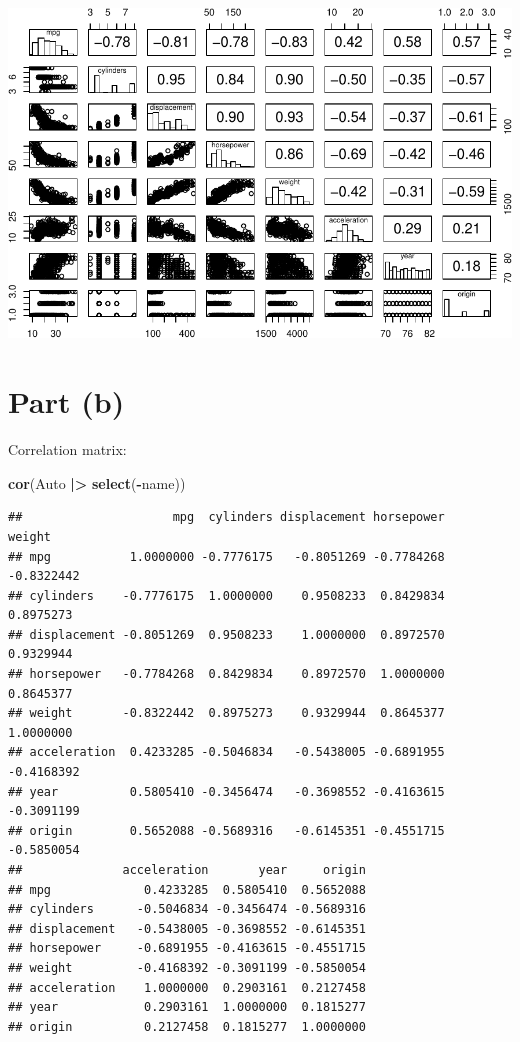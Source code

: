 \documentclass[
  11pt,
  a4paper]{article}
\newenvironment{Shaded}{\begin{snugshade}}{\end{snugshade}}
\newcommand{\FunctionTok}[1]{\textcolor[rgb]{0.13,0.29,0.53}{\textbf{#1}}}
\newcommand{\NormalTok}[1]{#1}
\newcommand{\SpecialCharTok}[1]{\textcolor[rgb]{0.81,0.36,0.00}{\textbf{#1}}}
\begin{document}
\includegraphics{Exercise-3.9_files/figure-latex/unnamed-chunk-3-1.pdf}

\section{Part (b)}\label{part-b}

Correlation matrix:

\begin{Shaded}
\begin{Highlighting}[]
\FunctionTok{cor}\NormalTok{(Auto }\SpecialCharTok{|\textgreater{}} \FunctionTok{select}\NormalTok{(}\SpecialCharTok{{-}}\NormalTok{name))}
\end{Highlighting}
\end{Shaded}

\begin{verbatim}
##                     mpg  cylinders displacement horsepower     weight
## mpg           1.0000000 -0.7776175   -0.8051269 -0.7784268 -0.8322442
## cylinders    -0.7776175  1.0000000    0.9508233  0.8429834  0.8975273
## displacement -0.8051269  0.9508233    1.0000000  0.8972570  0.9329944
## horsepower   -0.7784268  0.8429834    0.8972570  1.0000000  0.8645377
## weight       -0.8322442  0.8975273    0.9329944  0.8645377  1.0000000
## acceleration  0.4233285 -0.5046834   -0.5438005 -0.6891955 -0.4168392
## year          0.5805410 -0.3456474   -0.3698552 -0.4163615 -0.3091199
## origin        0.5652088 -0.5689316   -0.6145351 -0.4551715 -0.5850054
##              acceleration       year     origin
## mpg             0.4233285  0.5805410  0.5652088
## cylinders      -0.5046834 -0.3456474 -0.5689316
## displacement   -0.5438005 -0.3698552 -0.6145351
## horsepower     -0.6891955 -0.4163615 -0.4551715
## weight         -0.4168392 -0.3091199 -0.5850054
## acceleration    1.0000000  0.2903161  0.2127458
## year            0.2903161  1.0000000  0.1815277
## origin          0.2127458  0.1815277  1.0000000
\end{verbatim}
\end{document}
